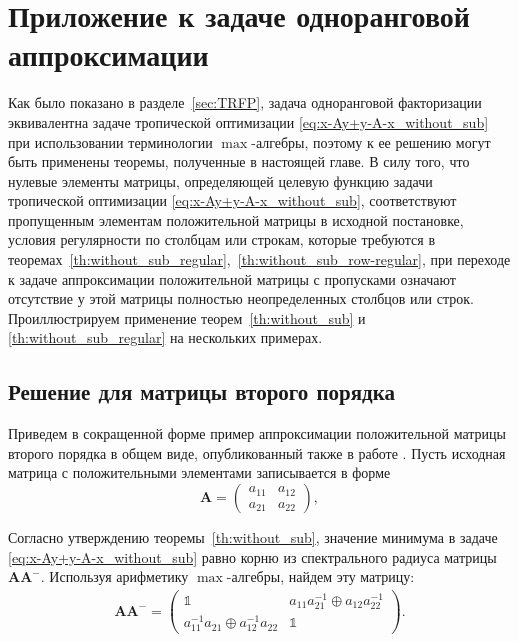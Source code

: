 \documentclass[specialist,
               substylefile = spbu.rtx,
               subf,href,colorlinks=true, 12pt]{disser}
\theoremstyle{definition}
\begin{document}
\section{Приложение к задаче одноранговой аппроксимации}
\label{S-AAP}
Как было показано в разделе~\ref{sec:TRFP}, задача одноранговой факторизации эквивалентна задаче тропической оптимизации \eqref{eq:x-Ay+y-A-x_without_sub} при использовании терминологии $\max$-алгебры, поэтому к ее решению могут быть применены теоремы, полученные в настоящей главе. %
В силу того, что нулевые элементы матрицы, определяющей целевую функцию задачи тропической оптимизации \eqref{eq:x-Ay+y-A-x_without_sub}, соответствуют пропущенным элементам положительной матрицы в исходной постановке, условия регулярности по столбцам или строкам, которые требуются в теоремах~\ref{th:without_sub_regular},~\ref{th:without_sub_row-regular}, при переходе к задаче аппроксимации положительной матрицы с пропусками означают отсутствие у этой матрицы полностью неопределенных столбцов или строк. 
Проиллюстрируем применение теорем~\ref{th:without_sub} и \ref{th:without_sub_regular} на нескольких примерах.

\subsection{Решение для матрицы второго порядка}\label{subsec:SSOM}
Приведем в сокращенной форме пример аппроксимации положительной матрицы второго порядка в общем виде, опубликованный также в работе \cite{Krivulin2019OnRankone}.
Пусть исходная матрица с положительными элементами записывается в форме
\begin{equation*}
\bm{A}=
\begin{pmatrix}
a_{11} &a_{12}
\\
a_{21} &a_{22}
\end{pmatrix},
\end{equation*}

Согласно утверждению теоремы~\ref{th:without_sub}, значение минимума в задаче \eqref{eq:x-Ay+y-A-x_without_sub} равно корню из спектрального радиуса матрицы $\bm{A}\bm{A}^{-}$. Используя арифметику $\max$-алгебры, найдем эту матрицу: 
\begin{gather*}
\bm{A}\bm{A}^{-}
=
\begin{pmatrix}
\mathbb{1} 
&a_{11}a_{21}^{-1}
\oplus 
a_{12}a_{22}^{-1}
\\
a_{11}^{-1}a_{21}
\oplus
a_{12}^{-1}a_{22} &\mathbb{1}
\end{pmatrix}.
\end{gather*}
\end{document}
